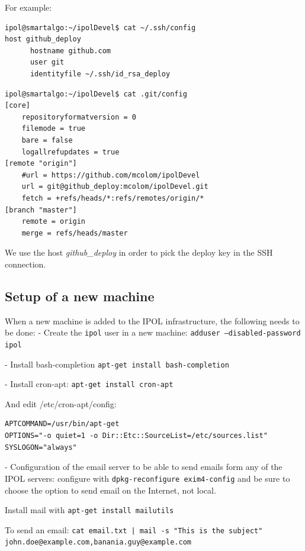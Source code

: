 For example:

\begin{verbatim}
ipol@smartalgo:~/ipolDevel$ cat ~/.ssh/config 
host github_deploy
      hostname github.com
      user git
      identityfile ~/.ssh/id_rsa_deploy
\end{verbatim}

\vspace{0.15cm}

\begin{verbatim}
ipol@smartalgo:~/ipolDevel$ cat .git/config 
[core]
	repositoryformatversion = 0
	filemode = true
	bare = false
	logallrefupdates = true
[remote "origin"]
	#url = https://github.com/mcolom/ipolDevel
	url = git@github_deploy:mcolom/ipolDevel.git
	fetch = +refs/heads/*:refs/remotes/origin/*
[branch "master"]
	remote = origin
	merge = refs/heads/master
\end{verbatim}

We use the host \emph{github\_deploy} in order to pick the deploy key in the SSH connection.

\subsection{Setup of a new machine}
When a new machine is added to the IPOL infrastructure, the following needs to be done:
- Create the {\tt ipol} user in a new machine: {\tt adduser --disabled-password ipol}

- Install bash-completion {\tt apt-get install bash-completion}

- Install cron-apt: {\tt apt-get install cron-apt}

And edit /etc/cron-apt/config:
\begin{verbatim}
APTCOMMAND=/usr/bin/apt-get
OPTIONS="-o quiet=1 -o Dir::Etc::SourceList=/etc/sources.list"
SYSLOGON="always"
\end{verbatim}

- Configuration of the email server to be able to send emails form any of the IPOL servers: configure with {\tt dpkg-reconfigure exim4-config} and be sure to choose the option to send email on the Internet, not local.

Install mail with {\tt apt-get install mailutils}

To send an email: {\tt cat email.txt | mail -s "This is the subject" john.doe@example.com,banania.guy@example.com}


